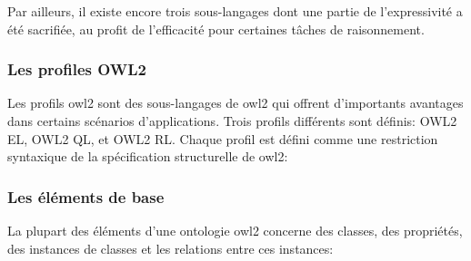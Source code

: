 Par ailleurs, il existe encore trois sous-langages dont une partie de
l'expressivité a été sacrifiée, au profit de l'efficacité pour
certaines tâches de raisonnement.

\subsubsection{Les profiles OWL2}
\label{sec:semantic-web-owl-owl2-profiles}

Les profils \acrshort{owl2} \cite{motik2009owl} sont des sous-langages
de \acrshort{owl2} qui offrent d'importants avantages dans certains
scénarios d'applications. Trois profils différents sont définis:
\textsf{OWL2 EL}, \textsf{OWL2 QL}, et \textsf{ OWL2 RL}. Chaque
profil est défini comme une restriction syntaxique de la spécification
structurelle de \acrshort{owl2}:

\subsubsection{Les éléments de base}
\label{sec:semantic-web-owl-owl2-elements}

La plupart des éléments d'une ontologie \acrshort{owl2} concerne des
classes, des propriétés, des instances de classes et les relations
entre ces instances:

\newpage
